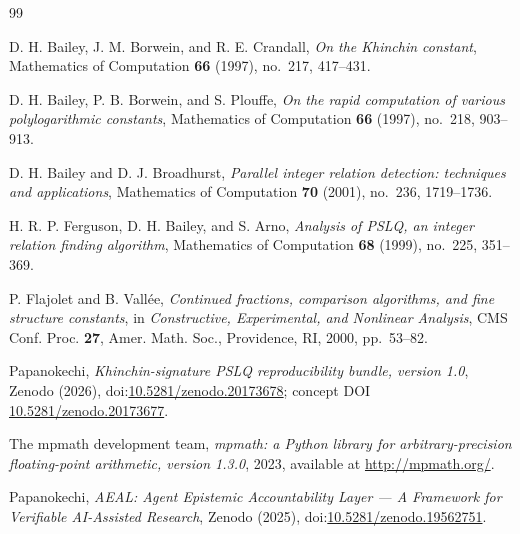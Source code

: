 \documentclass[11pt]{amsart}
\begin{document}
\begin{thebibliography}{99}

D. H. Bailey, J. M. Borwein, and R. E. Crandall,
\emph{On the Khinchin constant},
Mathematics of Computation \textbf{66} (1997), no.~217, 417--431.

D. H. Bailey, P. B. Borwein, and S. Plouffe,
\emph{On the rapid computation of various polylogarithmic constants},
Mathematics of Computation \textbf{66} (1997), no.~218, 903--913.

D. H. Bailey and D. J. Broadhurst,
\emph{Parallel integer relation detection: techniques and applications},
Mathematics of Computation \textbf{70} (2001), no.~236, 1719--1736.

H. R. P. Ferguson, D. H. Bailey, and S. Arno,
\emph{Analysis of PSLQ, an integer relation finding algorithm},
Mathematics of Computation \textbf{68} (1999), no.~225, 351--369.

P. Flajolet and B. Vall\'ee,
\emph{Continued fractions, comparison algorithms, and fine structure constants},
in \emph{Constructive, Experimental, and Nonlinear Analysis}, CMS Conf. Proc. \textbf{27},
Amer. Math. Soc., Providence, RI, 2000, pp.~53--82.

Papanokechi,
\emph{Khinchin-signature PSLQ reproducibility bundle, version 1.0},
Zenodo (2026), doi:\href{https://doi.org/10.5281/zenodo.20173678}{10.5281/zenodo.20173678}; concept DOI \href{https://doi.org/10.5281/zenodo.20173677}{10.5281/zenodo.20173677}.

The mpmath development team,
\emph{mpmath: a Python library for arbitrary-precision floating-point arithmetic, version 1.3.0},
2023, available at \url{http://mpmath.org/}.

Papanokechi,
\emph{AEAL: Agent Epistemic Accountability Layer --- A Framework for Verifiable AI-Assisted Research},
Zenodo (2025), doi:\href{https://doi.org/10.5281/zenodo.19562751}{10.5281/zenodo.19562751}.

\end{thebibliography}
\end{document}
